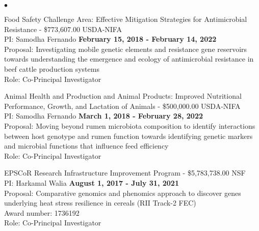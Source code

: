 \documentclass[margin,line,10pt]{res}
\newenvironment{list2}{
  \begin{list}{$\bullet$}{%
      \setlength{\itemsep}{0in}
      \setlength{\parsep}{0in} \setlength{\parskip}{0in}
      \setlength{\topsep}{0in} \setlength{\partopsep}{0in} 
      \setlength{\leftmargin}{0.2in}}}{\end{list}}
\begin{document}
\begin{resume}
\begin{list2}
\vspace{0.5cm}



\item Food Safety Challenge Area: Effective Mitigation Strategies for Antimicrobial Resistance  - \$773,607.00  \hfill USDA-NIFA\\
PI: Samodha Fernando   \hfill \textbf{February 15, 2018 - February 14, 2022}\\
Proposal: Investigating mobile genetic elements and resistance gene reservoirs towards understanding the emergence and ecology of antimicrobial resistance in beef cattle production systems  \\
Role: Co-Principal Investigator \\

\vspace{0.5cm}

\item Animal Health and Production and Animal Products: Improved Nutritional Performance, Growth, and Lactation of Animals  - \$500,000.00  \hfill USDA-NIFA\\
PI: Samodha Fernando   \hfill \textbf{March 1, 2018 - February 28, 2022}\\
Proposal: Moving beyond rumen microbiota composition to identify interactions between host genotype and rumen function towards identifying genetic markers and microbial functions that influence feed efficiency  \\
Role: Co-Principal Investigator \\

\vspace{0.5cm}





\vspace{0.5cm}
  
\item EPSCoR Research Infrastructure Improvement Program - \$5,783,738.00   \hfill NSF \\
PI: Harkamal Walia   \hfill \textbf{August 1, 2017 - July 31, 2021}\\
Proposal:  Comparative genomics and phenomics approach to discover genes underlying heat stress resilience in cereals  (RII Track-2 FEC)  \\
Award number: 1736192 \\
Role: Co-Principal Investigator \\


\end{list2}
\end{resume}
\end{document}
